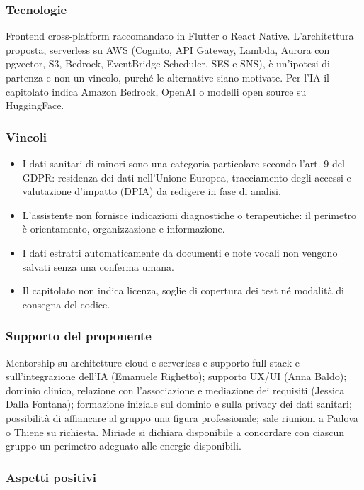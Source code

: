 \subsubsection*{Tecnologie}

Frontend cross-platform raccomandato in Flutter o React Native. L'architettura proposta, serverless su AWS (Cognito, API Gateway, Lambda, Aurora con pgvector, S3, Bedrock, EventBridge Scheduler, SES e SNS), è un'ipotesi di partenza e non un vincolo, purché le alternative siano motivate. Per l'IA il capitolato indica Amazon Bedrock, OpenAI o modelli open source su HuggingFace.

\subsubsection*{Vincoli}

\begin{itemize}
    \item I dati sanitari di minori sono una categoria particolare secondo l'art. 9 del GDPR: residenza dei dati nell'Unione Europea, tracciamento degli accessi e valutazione d'impatto (DPIA) da redigere in fase di analisi.
    \item L'assistente non fornisce indicazioni diagnostiche o terapeutiche: il perimetro è orientamento, organizzazione e informazione.
    \item I dati estratti automaticamente da documenti e note vocali non vengono salvati senza una conferma umana.
    \item Il capitolato non indica licenza, soglie di copertura dei test né modalità di consegna del codice.
\end{itemize}

\subsubsection*{Supporto del proponente}

Mentorship su architetture cloud e serverless e supporto full-stack e sull'integrazione dell'IA (Emanuele Righetto); supporto UX/UI (Anna Baldo); dominio clinico, relazione con l'associazione e mediazione dei requisiti (Jessica Dalla Fontana); formazione iniziale sul dominio e sulla privacy dei dati sanitari; possibilità di affiancare al gruppo una figura professionale; sale riunioni a Padova o Thiene su richiesta. Miriade si dichiara disponibile a concordare con ciascun gruppo un perimetro adeguato alle energie disponibili.

\subsubsection*{Aspetti positivi}


